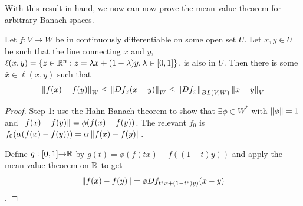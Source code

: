 With this result in hand, we now can now prove the mean value theorem
for arbitrary Banach spaces.
\begin{theorem}
  Let $f:V \to W$ be in continuously differentiable on some open
  set $U$. Let $x, y \in U$ be such that the line connecting $x$ and
  $y$,
  $\ell(x,y) = \{z\in \mathbb{R}^n: z = \lambda x + (1-\lambda) y, \lambda \in
  [0,1]\}$, is also in $U$. Then there is some $\bar{x} \in \ell(x,y)$
  such that
  \[ \left\Vert {f(x) - f(y)} \right\Vert_W \leq \left\Vert {Df_{\bar{x}} (x-y)} \right\Vert_W \leq
    \left\Vert {Df_{\bar{x}}} \right\Vert_{BL(V,W)} \left\Vert {x-y} \right\Vert_V \]
\end{theorem}
\begin{proof}
  Step 1: use the Hahn Banach theorem to show that $\exists \phi \in
  W^*$ with $\left\Vert {\phi} \right\Vert=1$ and $\left\Vert {f(x) - f(y)} \right\Vert = \phi(f(x) -
  f(y))$. The relevant $f_0$ is $f_0(\alpha(f(x) - f(y))) = \alpha
  \left\Vert {f(x) - f(y)} \right\Vert$. 

  Define $g:[0,1] {\rightarrow} \mathbb{R}$ by $g(t) = \phi(f( t x) - f((1-t) y))$ and
  apply the mean value theorem on $\mathbb{R}$ to get 
  \[ \left\Vert {f(x) - f(y)} \right\Vert = \phi Df_{t^*x + (1-t^*) y)} (x-y) \].
\end{proof}




